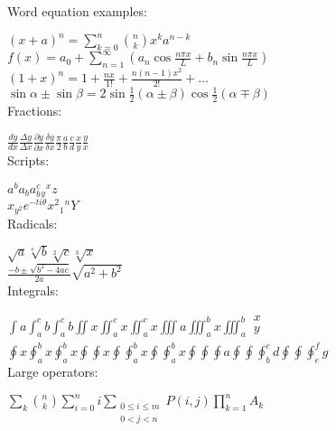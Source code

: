 \documentclass[12pt, a4paper]{article}
\begin{document}
Word equation examples:

$(x+a)^{n}=\sum_{k=0}^{n}{\binom{n}{k}x^{k}a^{
n-k}}$\\


$f(x)=a_{0}+\sum_{n=1}^{\infty }{(a_{n}\cos 
\frac{n\pi x}{L}+b_{n}\sin \frac{n\pi x}{L})}$\\


$(1+x)^{n}=1+\frac{nx}{1!}+\frac{n(n-1)x^{2}}{2!
}+\ldots $\\


$\sin \alpha \pm \sin \beta =2\sin \frac{1}{2}(\alpha \pm \beta 
)\cos \frac{1}{2}(\alpha \mp \beta )$\\




Fractions:

$\frac{dy}{dx}\frac{\Delta y}{\Delta x}\frac{\partial y}{
\partial x}\frac{\delta y}{\delta x}\frac{\pi }{2}\frac{a}{
b}\frac{c}{d}\frac{x}{y}\frac{y}{x}$\\


Scripts:

$a^{b} a_{b }a_{b}^{c}{}_{ y}{}^{x}z$\\


$x_{y^{2}}e^{-ti\theta }x^{2}{}_{1}{}^{n}Y$\\


Radicals:

$\sqrt{a}\sqrt[s]{b}\sqrt[2]{c}\sqrt[3]{x}$\\


$\frac{-b\pm \sqrt{b^{2}-4ac}}{2a}\sqrt{a^{2}+b^{2
}}$\\


Integrals:

$\int{a\int_{a}^{c}{b}}\int_{a}^{c}{b}\iint{x
}\iint_{a}^{c}{x}\iint_{a}^{c}{x}\iiint{a}
\iiint_{a}^{b}{x}\iiint_{a}^{b}{
\begin{gathered}
x \\
y \\
\end{gathered}
}$\\




$\oint{x}\oint_{a}^{b}{x\oint_{a}^{b}{x\oint\oint
{x\oint\oint_{a}^{b}{x\oint\oint_{a}^{b}{x}}}}}
\oint\oint\oint{a}\oint\oint\oint_{b}^{c}{d}
\oint\oint\oint_{e}^{f}{g}$\\


Large operators:

$\sum_{k}{\binom{n}{k}}\sum_{i=0}^{n}{i\sum_{
\begin{gathered}
0\le i \le m \\
0<j<n  \\
\end{gathered}
}{P(i,j)}\prod_{k=1}^{n}{A_{k}}}$\\
\end{document}
